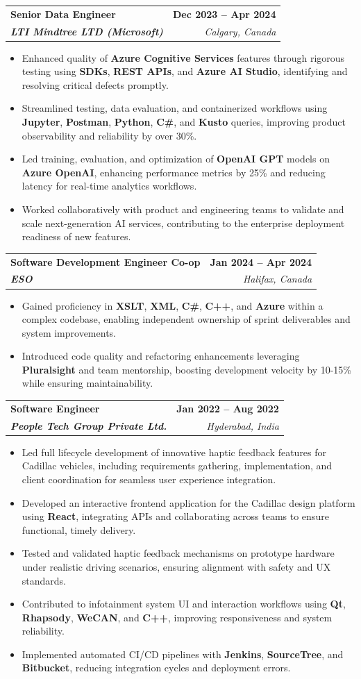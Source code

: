 \documentclass[letterpaper,11pt]{article}
\makeatletter
\newcommand{\resumeItem}[1]{
  \item\small{
    {#1 \vspace{-2pt}}
  }
}
\newcommand{\resumeSubheading}[4]{
  \vspace{-2pt}\item
    \begin{tabular*}{1.0\textwidth}[t]{l@{\extracolsep{\fill}}r}
      \textbf{#1} & \textbf{\small #2} \\
      \textit{\small#3} & \textit{\small #4} \\
    \end{tabular*}\vspace{-7pt}
}
\newcommand{\resumeItemListStart}{\begin{itemize}}
\newcommand{\resumeItemListEnd}{\end{itemize}\vspace{-5pt}}
\makeatother
\begin{document}
    \resumeSubheading
      {\textbf{Senior Data Engineer}}{\textbf{Dec 2023 -- Apr 2024}}
      {\textbf{LTI Mindtree LTD (Microsoft)}}{Calgary, Canada}
      \resumeItemListStart
        \resumeItem{Enhanced quality of \textbf{Azure Cognitive Services} features through rigorous testing using \textbf{SDKs}, \textbf{REST APIs}, and \textbf{Azure AI Studio}, identifying and resolving critical defects promptly.}
        \resumeItem{Streamlined testing, data evaluation, and containerized workflows using \textbf{Jupyter}, \textbf{Postman}, \textbf{Python}, \textbf{C\#}, and \textbf{Kusto} queries, improving product observability and reliability by over 30\%.}
        \resumeItem{Led training, evaluation, and optimization of \textbf{OpenAI GPT} models on \textbf{Azure OpenAI}, enhancing performance metrics by 25\% and reducing latency for real-time analytics workflows.}
        \resumeItem{Worked collaboratively with product and engineering teams to validate and scale next-generation AI services, contributing to the enterprise deployment readiness of new features.}
      \resumeItemListEnd
    
    \resumeSubheading
      {\textbf{Software Development Engineer Co-op}}{\textbf{Jan 2024 -- Apr 2024}}
      {\textbf{ESO}}{Halifax, Canada}
      \resumeItemListStart
        \resumeItem{Gained proficiency in \textbf{XSLT}, \textbf{XML}, \textbf{C\#}, \textbf{C++}, and \textbf{Azure} within a complex codebase, enabling independent ownership of sprint deliverables and system improvements.}
        \resumeItem{Introduced code quality and refactoring enhancements leveraging \textbf{Pluralsight} and team mentorship, boosting development velocity by 10-15\% while ensuring maintainability.}
      \resumeItemListEnd

    \resumeSubheading
      {\textbf{Software Engineer}}{\textbf{Jan 2022 -- Aug 2022}}
      {\textbf{People Tech Group Private Ltd.}}{Hyderabad, India}
      \resumeItemListStart
        \resumeItem{Led full lifecycle development of innovative haptic feedback features for Cadillac vehicles, including requirements gathering, implementation, and client coordination for seamless user experience integration.}
        \resumeItem{Developed an interactive frontend application for the Cadillac design platform using \textbf{React}, integrating APIs and collaborating across teams to ensure functional, timely delivery.}
        \resumeItem{Tested and validated haptic feedback mechanisms on prototype hardware under realistic driving scenarios, ensuring alignment with safety and UX standards.}
        \resumeItem{Contributed to infotainment system UI and interaction workflows using \textbf{Qt}, \textbf{Rhapsody}, \textbf{WeCAN}, and \textbf{C++}, improving responsiveness and system reliability.}
        \resumeItem{Implemented automated CI/CD pipelines with \textbf{Jenkins}, \textbf{SourceTree}, and \textbf{Bitbucket}, reducing integration cycles and deployment errors.}
      \resumeItemListEnd
\end{document}
